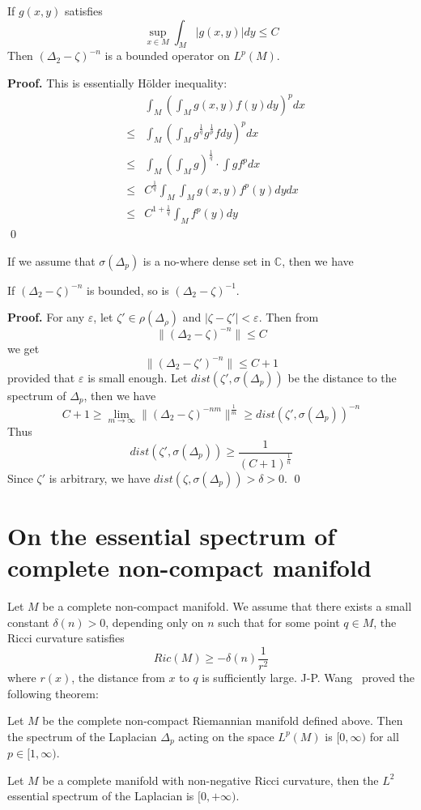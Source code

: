 \begin{lemma}
If $g(x,y)$ satisfies
\[
\sup_{x\in M}\int_M |g(x,y)|dy \leqslant C
\]
Then $(\Delta_2 - \zeta)^{-n}$ is a bounded operator on $L^p(M)$.
\end{lemma}
{\bf Proof.}
This is essentially H\"{o}lder inequality:
\begin{eqnarray}
\nonumber & & \int_M \left(\int_M g(x,y)f(y)dy\right)^p dx \\
\nonumber & \leqslant 
& \int_M \left(\int_M g^{\frac{1}{q}}g^{\frac{1}{p}}fdy\right)^p dx \\
\nonumber & \leqslant & \int_M\left(\int_M g\right)^{\frac{1}{q}} \cdot 
\int gf^p dx \\
\nonumber & \leqslant & C^{\frac{1}{q}} \int_M\int_M g(x,y)f^p(y)dydx \\
\nonumber & \leqslant & C^{1+\frac{1}{q}}\int_M f^p(y)dy
\end{eqnarray}
\qed

If we assume that $\sigma(\Delta_p)$ is a no-where dense set in $\mathbb{C}$,
then we have
\begin{lemma}
If $(\Delta_2 - \zeta)^{-n}$ is bounded, so is $(\Delta_2 - \zeta)^{-1}$.
\end{lemma}
{\bf Proof.}
For any $\varepsilon$, let $\zeta '\in\rho(\Delta_\rho)$ and 
$|\zeta - \zeta '| < \varepsilon$. Then from
\[
\|(\Delta_2 - \zeta)^{-n}\| \leqslant C
\]
we get
\[
\|(\Delta_2 - \zeta ')^{-n}\| \leqslant C+1
\]
provided that $\varepsilon$ is small enough. Let 
$dist(\zeta ', \sigma(\Delta_p))$ be the distance to the spectrum of $\Delta_p$,
then we have
\[
C+1 \geqslant \lim_{m\rightarrow \infty} \|(\Delta_2 - 
\zeta)^{-nm}\|^{\frac{1}{m}} \geqslant dist(\zeta ', \sigma(\Delta_p))^{-n}
\]
Thus
\[
dist(\zeta ', \sigma(\Delta_p)) \geqslant \frac{1}{(C+1)^{\frac{1}{n}}}
\]
Since $\zeta '$ is arbitrary, we have 
$dist(\zeta, \sigma(\Delta_p)) > \delta > 0$.
\qed
\section{On the essential spectrum of complete non-compact manifold}
Let  $M$ be a complete non-compact manifold.
We assume that  there exists a small constant $\delta(n) > 0$, depending only on
$n$ such that for some point $q\in M$, the Ricci curvature satisfies
\[
Ric(M) \geqslant -\delta(n)\frac{1}{r^2}
\]
where $r(x)$, the distance from $x$ to $q$ is sufficiently large.
J-P. Wang~\cite{wang} proved the following theorem:
\begin{theorem}
Let $M$ be the complete non-compact Riemannian manifold defined above. Then the spectrum of the
Laplacian $\Delta_p$ acting on the space $L^p(M)$ is $[0, \infty)$ for all
$p\in[1,\infty)$.
\end{theorem}
\begin{corollary}
Let $M$ be a complete manifold with non-negative Ricci curvature, then the $L^2$
essential spectrum of the Laplacian is $[0, +\infty)$.
\end{corollary}




